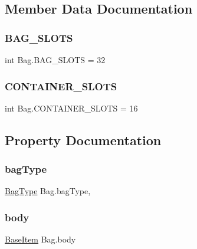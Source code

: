 \subsection{Member Data Documentation}
\mbox{\label{class_bag_aa3277af2938bf5bc9447535318668ced}} 
\subsubsection{\texorpdfstring{BAG\_SLOTS}{BAG\_SLOTS}}
{\footnotesize\ttfamily int Bag.\+B\+A\+G\+\_\+\+S\+L\+O\+TS = 32\hspace{0.3cm}{\ttfamily [static]}}

\mbox{\label{class_bag_ac513120e71acce6fffca5d0e78733182}} 
\subsubsection{\texorpdfstring{CONTAINER\_SLOTS}{CONTAINER\_SLOTS}}
{\footnotesize\ttfamily int Bag.\+C\+O\+N\+T\+A\+I\+N\+E\+R\+\_\+\+S\+L\+O\+TS = 16\hspace{0.3cm}{\ttfamily [static]}}



\subsection{Property Documentation}
\mbox{\label{class_bag_a84ac63a7f36a20bc22ab8c2de86babcc}} 
\subsubsection{\texorpdfstring{bagType}{bagType}}
{\footnotesize\ttfamily \mbox{\hyperlink{class_bag_a5a827c44705d57202edc93b9a39316c7}{Bag\+Type}} Bag.\+bag\+Type\hspace{0.3cm}{\ttfamily [get]}, {\ttfamily [set]}}

\mbox{\label{class_bag_a1c9c49018ee2e88c1fd09df3bd6d9d9f}} 
\subsubsection{\texorpdfstring{body}{body}}
{\footnotesize\ttfamily \mbox{\hyperlink{class_base_item}{Base\+Item}} Bag.\+body\hspace{0.3cm}{\ttfamily [get]}}



